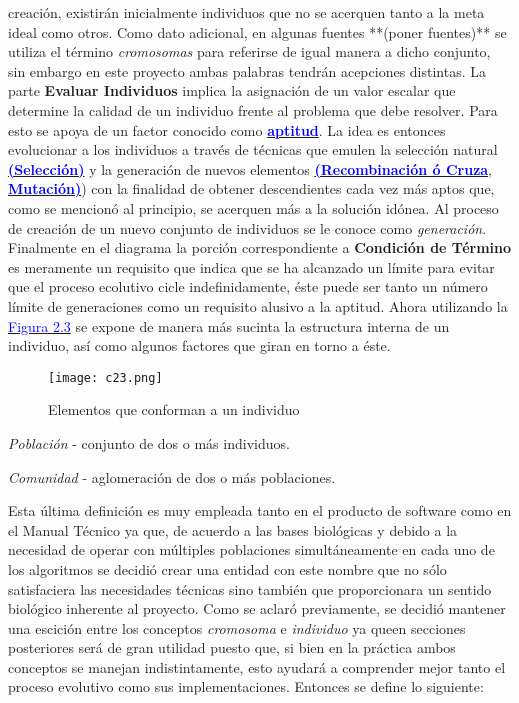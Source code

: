 \documentclass[class=report, crop=false]{standalone}
\begin{document}
creación, existirán inicialmente individuos que no se acerquen 
tanto a la meta ideal como otros.\break
Como dato adicional, en algunas fuentes **(poner fuentes)** se 
utiliza el término \textit{cromosomas} para referirse de igual 
manera a dicho conjunto, sin embargo en este proyecto ambas 
palabras tendrán acepciones distintas.\medskip\break
La parte \textbf{Evaluar Individuos} implica la asignación de 
un valor escalar que determine la calidad de un individuo frente 
al problema que debe resolver. Para esto se apoya de un factor 
conocido como \hyperref[sec:c2_3]{\textbf{\textcolor{blue}{aptitud}}}.\medskip\break
La idea es entonces evolucionar a los individuos a través de 
técnicas que emulen la selección natural \hyperref[sec:c2_4]{\textbf{\textcolor{blue}{(Selección)}}}
y la generación de nuevos elementos \hyperref[sec:c2_5]{\textbf{\textcolor{blue}{(Recombinación ó Cruza}}}, \hyperref[sec:c2_6]{\textbf{\textcolor{blue}{Mutación)}}}) con la finalidad de obtener descendientes cada vez 
más aptos que, como se mencionó al principio, se acerquen más 
a la solución idónea.\break
Al proceso de creación de un nuevo conjunto de individuos se le 
conoce como \textit{generación}.\medskip\break 
Finalmente en el diagrama la porción correspondiente a \textbf{Condición de Término}
es meramente un requisito que indica que se ha alcanzado un 
límite para evitar que el proceso ecolutivo cicle indefinidamente, 
éste puede ser tanto un número límite de generaciones como un 
requisito alusivo a la aptitud.\medskip\break
Ahora utilizando la \hyperref[sec:c2_7]{\textcolor{blue}{Figura 2.3}} 
se expone de manera más sucinta la estructura interna de un 
individuo, así como algunos factores que giran en torno a 
éste.%
\begin{figure}[ht]
\centering
\label{sec:c2_7}
\texttt{[image: c23.png]}
\caption{Elementos que conforman a un individuo}
\end{figure}\break

\begin{definition} 
\textit{Población} - conjunto de dos o más individuos.
\end{definition}

\begin{definition} 
\textit{Comunidad} - aglomeración de dos o más poblaciones.\break
\end{definition}

Esta última definición es muy empleada tanto en el producto 
de software como en el Manual Técnico ya que, de acuerdo a 
las bases biológicas \cite{b3} y debido a la necesidad de 
operar con múltiples poblaciones simultáneamente en cada 
uno de los algoritmos se decidió crear una entidad con este 
nombre que no sólo satisfaciera las necesidades técnicas 
sino también que proporcionara un sentido biológico inherente 
al proyecto.\break
Como se aclaró previamente, se decidió mantener una escición
entre los conceptos \textit{cromosoma} e \textit{individuo} 
ya queen secciones posteriores será de gran utilidad puesto que, 
si bien en la práctica ambos conceptos se manejan indistintamente, 
esto ayudará a comprender mejor tanto el proceso evolutivo como 
sus implementaciones.\medskip\break
Entonces se define lo siguiente:
\end{document}
